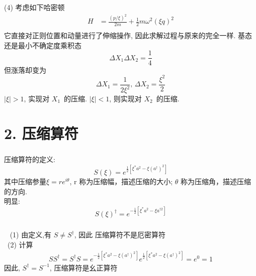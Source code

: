 \begin{frame}
 \frametitle{}
 (4)  
 考虑如下哈密顿 
 \[\begin{aligned}
     H &= \frac{(p/\xi)^2}{2m} +\frac{1}{2}m \omega^2 (\xi q)^2  \\ 
 \end{aligned} \]    
 它直接对正则位置和动量进行了伸缩操作, 因此求解过程与原来的完全一样. 基态还是最小不确定度乘积态
 \[ \Delta X_1 \Delta X_2 =\dfrac{1}{4}\] 
 但涨落却变为 
 \[ \Delta X_1  = \frac{1}{2 \xi^2}, \, \Delta X_2  = \frac{\xi^2}{2}\]  
 $\left|\xi\right|>1$, 实现对 $X_1 $ 的压缩. $\left|\xi\right|<1$, 则实现对 $X_2 $ 的压缩. 

 
\end{frame}



\section{2. 压缩算符}

\begin{frame}
 \frametitle{}
 \begin{center}
    \begin{tcolorbox2}[0.86]{压缩算符的定义:}
    \[ S(\xi) = e^{\frac{1}{2}[\xi^* a^2 - \xi (a^{\dagger}) ^2]}\]
    其中压缩参量$\xi= r e^{i\theta}$, r 称为压缩幅，描述压缩的大小; $\theta$ 称为压缩角，描述压缩的方向. \\
    明显:  
    \[ S(\xi)^\dagger = e^{-\frac{1}{2}[\xi^* a^2 - \xi a^{\dagger 2}]}\]
   \end{tcolorbox2}  
\end{center}    
\end{frame}

\begin{frame}
 \frametitle{}
    \证 ~ (1) 由定义,有 $S \not = S^\dagger$, 因此 压缩算符不是厄密算符 \\ 
    \证 ~(2) 计算
    \[\begin{aligned}
        S S^\dagger = S^\dagger S = e^{-\frac{1}{2}[\xi^* a^2 - \xi (a^{\dagger}) ^2]} e^{\frac{1}{2}[\xi^* a^2 - \xi (a^{\dagger}) ^2]} =e^0 =1
    \end{aligned} \]
     因此,  $S^\dagger = S^{-1} $,  压缩算符是幺正算符
\end{frame}

